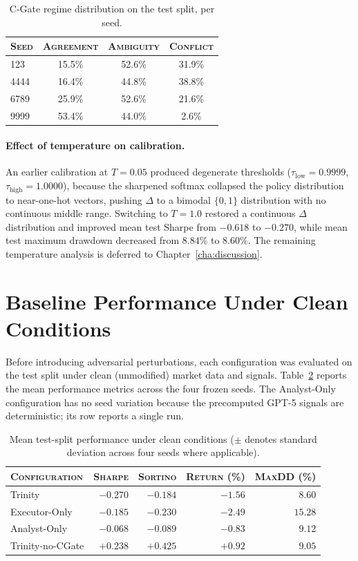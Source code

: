 \begin{table}[h]
\centering
\caption{C-Gate regime distribution on the test split, per seed.}
\label{tab:regime-test}
\begin{tabular}{lccc}
\toprule
\textsc{Seed} & \textsc{Agreement} & \textsc{Ambiguity} &
  \textsc{Conflict} \\
\midrule
123  & 15.5\% & 52.6\% & 31.9\% \\
4444 & 16.4\% & 44.8\% & 38.8\% \\
6789 & 25.9\% & 52.6\% & 21.6\% \\
9999 & 53.4\% & 44.0\% &  2.6\% \\
\bottomrule
\end{tabular}
\end{table}

\paragraph{Effect of temperature on calibration.}
An earlier calibration at $T = 0.05$ produced degenerate thresholds
($\tau_{\text{low}} = 0.9999$, $\tau_{\text{high}} = 1.0000$), because the
sharpened softmax collapsed the policy distribution to near-one-hot vectors,
pushing $\Delta$ to a bimodal $\{0, 1\}$ distribution with no continuous
middle range. Switching to $T = 1.0$ restored a continuous $\Delta$
distribution and improved mean test Sharpe from $-0.618$ to $-0.270$, while
mean test maximum drawdown decreased from $8.84\%$ to $8.60\%$. The
remaining temperature analysis is deferred to Chapter~\ref{cha:discussion}.

\section{Baseline Performance Under Clean Conditions}
\label{sec:baselines}

Before introducing adversarial perturbations, each configuration was
evaluated on the test split under clean (unmodified) market data and
signals. Table~\ref{tab:clean-baselines} reports the mean performance
metrics across the four frozen seeds. The Analyst-Only configuration has no
seed variation because the precomputed GPT-5 signals are deterministic;
its row reports a single run.

\begin{table}[h]
\centering
\caption{Mean test-split performance under clean conditions ($\pm$ denotes
  standard deviation across four seeds where applicable).}
\label{tab:clean-baselines}
\begin{tabular}{lrrrr}
\toprule
\textsc{Configuration} & \textsc{Sharpe} & \textsc{Sortino} &
  \textsc{Return (\%)} & \textsc{MaxDD (\%)} \\
\midrule
Trinity           & $-0.270$ & $-0.184$ & $-1.56$ & $\mathbf{8.60}$ \\
Executor-Only     & $-0.185$ & $-0.230$ & $-2.49$ & $15.28$ \\
Analyst-Only      & $-0.068$ & $-0.089$ & $-0.83$ & $9.12$ \\
Trinity-no-CGate  & $+0.238$ & $+0.425$ & $+0.92$ & $9.05$ \\
\bottomrule
\end{tabular}
\end{table}

